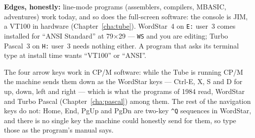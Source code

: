 \begin{aside}
\textbf{Edges, honestly:} line-mode programs (assemblers, compilers,
MBASIC, adventures) work today, and so does the full-screen software:
the console is JIM, a VT100 in hardware (Chapter~\ref{cha:tube}).
WordStar~4 on \texttt{E:} user~3 comes installed for ``ANSI Standard''
at 79$\times$29 --- \verb|WS| and you are editing; Turbo Pascal~3 on
\texttt{H:} user~3 needs nothing either. A program that asks its
terminal type at install time wants ``VT100'' or ``ANSI''.

The four arrow keys work in CP/M software: while the Tube is running
CP/M the machine sends them down as the WordStar keys --- Ctrl-E, X, S
and D for up, down, left and right --- which is what the programs of 1984
read, WordStar and Turbo Pascal (Chapter~\ref{cha:pascal}) among them.
The rest of the navigation keys do not: Home, End, PgUp and PgDn are
two-key \texttt{\textasciicircum Q} sequences in WordStar, and there is
no single key the machine could honestly send for them, so type those as
the program's manual says.

\end{aside}
